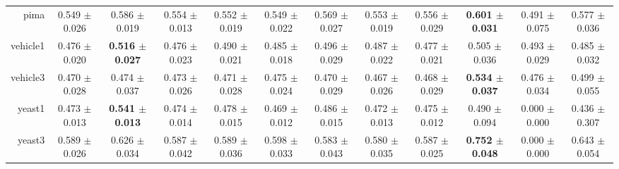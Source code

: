 \begin{table}[!ht]
{\begin{tabular}{r c c c c c c c c c c c}
pima & 0.549 $\pm$ 0.026 & 0.586 $\pm$ 0.019 & 0.554 $\pm$ 0.013 & 0.552 $\pm$ 0.019 & 0.549 $\pm$ 0.022 & 0.569 $\pm$ 0.027 & 0.553 $\pm$ 0.019 & 0.556 $\pm$ 0.029 & \textbf{0.601 $\pm$ 0.031} & 0.491 $\pm$ 0.075 & 0.577 $\pm$ 0.036 \\
vehicle1 & 0.476 $\pm$ 0.020 & \textbf{0.516 $\pm$ 0.027} & 0.476 $\pm$ 0.023 & 0.490 $\pm$ 0.021 & 0.485 $\pm$ 0.018 & 0.496 $\pm$ 0.029 & 0.487 $\pm$ 0.022 & 0.477 $\pm$ 0.021 & 0.505 $\pm$ 0.036 & 0.493 $\pm$ 0.029 & 0.485 $\pm$ 0.032 \\
vehicle3 & 0.470 $\pm$ 0.028 & 0.474 $\pm$ 0.037 & 0.473 $\pm$ 0.026 & 0.471 $\pm$ 0.028 & 0.475 $\pm$ 0.024 & 0.470 $\pm$ 0.029 & 0.467 $\pm$ 0.026 & 0.468 $\pm$ 0.029 & \textbf{0.534 $\pm$ 0.037} & 0.476 $\pm$ 0.034 & 0.499 $\pm$ 0.055 \\
yeast1 & 0.473 $\pm$ 0.013 & \textbf{0.541 $\pm$ 0.013} & 0.474 $\pm$ 0.014 & 0.478 $\pm$ 0.015 & 0.469 $\pm$ 0.012 & 0.486 $\pm$ 0.015 & 0.472 $\pm$ 0.013 & 0.475 $\pm$ 0.012 & 0.490 $\pm$ 0.094 & 0.000 $\pm$ 0.000 & 0.436 $\pm$ 0.307 \\
yeast3 & 0.589 $\pm$ 0.026 & 0.626 $\pm$ 0.034 & 0.587 $\pm$ 0.042 & 0.589 $\pm$ 0.036 & 0.598 $\pm$ 0.033 & 0.583 $\pm$ 0.043 & 0.580 $\pm$ 0.035 & 0.587 $\pm$ 0.025 & \textbf{0.752 $\pm$ 0.048} & 0.000 $\pm$ 0.000 & 0.643 $\pm$ 0.054 \\
\end{tabular}}
\end{table}
